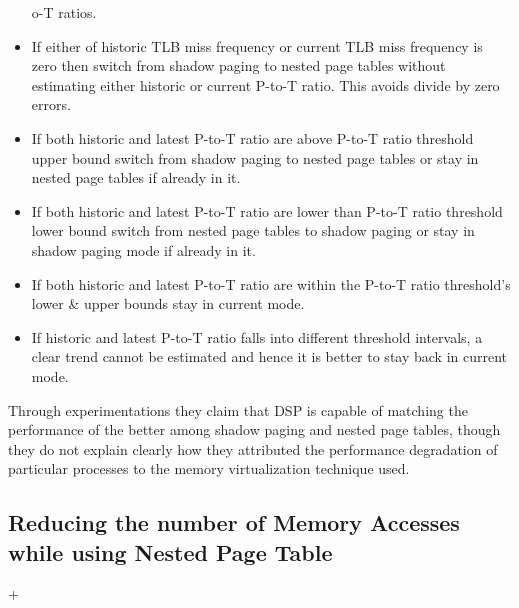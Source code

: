 \begin{itemize}
o-T ratios.
\item If either of historic TLB miss frequency or current TLB miss frequency is zero then switch
from shadow paging to nested page tables without estimating either historic or current P-to-T
ratio. This avoids divide by zero errors.
\item If both historic and latest P-to-T ratio are above P-to-T ratio threshold upper bound switch
from shadow paging to nested page tables or stay in nested page tables if already in it.
\item If both historic and latest P-to-T ratio are lower than P-to-T ratio threshold lower bound
switch from nested page tables to shadow paging or stay in shadow paging mode if already in it.
\item If both historic and latest P-to-T ratio are within the P-to-T ratio threshold's lower \&
upper bounds stay in current mode.
\item If historic and latest P-to-T ratio falls into different threshold intervals, a clear trend
cannot be estimated and hence it is better to stay back in current mode.     
\end{itemize}
Through experimentations they claim that DSP is capable of matching the performance of the better
among shadow paging and nested page tables, though they do not explain clearly how they attributed
the performance degradation of particular processes to the memory virtualization technique used.
\subsection{Reducing the number of Memory Accesses while using Nested Page Table}     
+